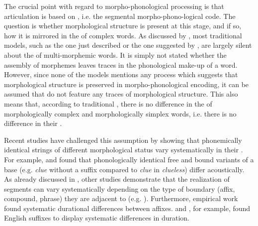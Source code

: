 {{%
The crucial point with regard to morpho-phonological processing is that articulation is based on , i.e. the segmental morpho-phono-logical code. The question is whether morphological structure is present at this stage, and if so, how it is mirrored in the  of complex words.
 As discussed by \citet[1037]{CohenGoldberg.2013}, most traditional models, such as the one just described or the one suggested by \cite{Dell.1986}, are largely silent about the  of multi-morphemic words. It is simply not stated whether the assembly of morphemes leaves traces in the phonological make-up of a word. However, since none of the models mentions any process which suggests that morphological structure is preserved in morpho-phonological encoding, it can be assumed that  do not feature any traces of morphological structure. This also means that, according to traditional , there is no difference in the  of morphologically complex and morphologically simplex words, i.e. there is no difference in their .

Recent studies have challenged this assumption by showing that phonemically identical strings of different morphological status vary systematically in their . For example, \cite{Kemps.2005} and \citet{Blazej.2015} found that phonologically identical free and bound variants of a base (e.g. \textit{clue} without a suffix compared to \textit{clue} in \textit{clueless}) differ acoustically.
As already discussed in , other studies demonstrate that the realization of segments can vary systematically depending on the type of boundary (affix, compound, phrase) they are adjacent to  (e.g. \citealt{Sproat.1993b, Smith.2012,LeeKim.2013}). Furthermore, empirical work found systematic durational differences between  affixes. \cite{Plag.2017} and \cite{Godfrey.2016}, for example, found  English suffixes to display systematic differences in duration.
 
}}
